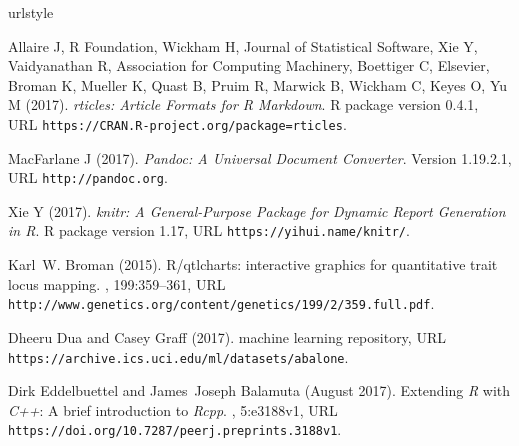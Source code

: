 \documentclass[letterpaper,9pt,twocolumn,twoside,]{pinp}
\begin{document}
\begin{thebibliography}{3}
\newcommand{\enquote}[1]{``#1''}
\providecommand{\natexlab}[1]{#1}
\providecommand{\url}[1]{\texttt{#1}}
\providecommand{\urlprefix}{URL }
\expandafter\ifx\csname urlstyle\endcsname\relax
  \providecommand{\doi}[1]{doi:\discretionary{}{}{}#1}\else
  \providecommand{\doi}{doi:\discretionary{}{}{}\begingroup
  \urlstyle{rm}\Url}\fi
\providecommand{\eprint}[2][]{\url{#2}}



Allaire J, {R Foundation}, Wickham H, {Journal of Statistical Software}, Xie Y,
  Vaidyanathan R, {Association for Computing Machinery}, Boettiger C,
  {Elsevier}, Broman K, Mueller K, Quast B, Pruim R, Marwick B, Wickham C,
  Keyes O, Yu M (2017).
\newblock \emph{rticles: Article Formats for R Markdown}.
\newblock R package version 0.4.1,
  \urlprefix\url{https://CRAN.R-project.org/package=rticles}.

MacFarlane J (2017).
\newblock \emph{Pandoc: A Universal Document Converter}.
\newblock Version 1.19.2.1, \urlprefix\url{http://pandoc.org}.

Xie Y (2017).
\newblock \emph{knitr: A General-Purpose Package for Dynamic Report Generation
  in R}.
\newblock R package version 1.17, \urlprefix\url{https://yihui.name/knitr/}.

Karl~W. Broman (2015).
\newblock R/qtlcharts: interactive graphics for quantitative trait locus
  mapping.
, 199:359--361, \urlprefix\url{http://www.genetics.org/content/genetics/199/2/359.full.pdf}.

Dheeru Dua and Casey Graff (2017).
 machine learning repository, \urlprefix\url{https://archive.ics.uci.edu/ml/datasets/abalone}.

Dirk Eddelbuettel and James~Joseph Balamuta (August 2017).
\newblock Extending \textit{R} with \textit{C++}: A brief introduction to
  \textit{Rcpp}.
, 5:e3188v1, \urlprefix \url{https://doi.org/10.7287/peerj.preprints.3188v1}.


\end{thebibliography}
\end{document}
